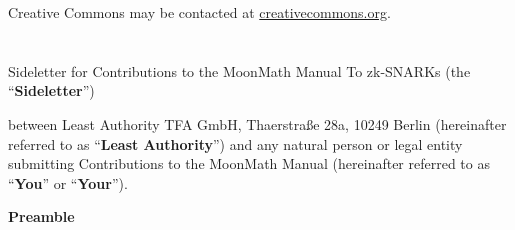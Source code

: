 Creative Commons may be contacted at \href{creativecommons.org}{creativecommons.org}.

\chapter*{ }
\label{chapter:contrib}

\begin{center}\Large 
Sideletter for Contributions to the MoonMath Manual To zk-SNARKs (the ``\textbf{Sideletter}'')
\end{center}\label{sideletter}

between Least Authority TFA GmbH, Thaerstraße 28a, 10249 Berlin (hereinafter referred to as ``\textbf{Least Authority}'') and any natural person or legal entity submitting Contributions to the MoonMath Manual (hereinafter referred to as ``\textbf{You}'' or ``\textbf{Your}''). 
\begin{center}\bfseries
Preamble
\end{center}
